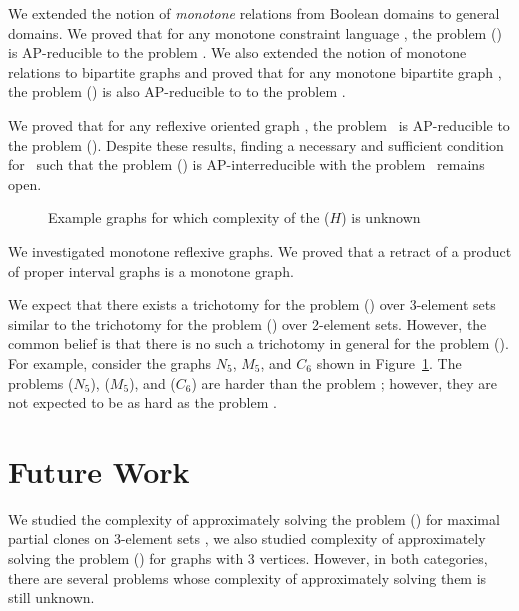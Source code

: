 We extended the notion of \emph{monotone} relations from Boolean domains to 
general domains. We proved that for any monotone constraint language \mrelset,
the problem \ccsp(\mrelset) is AP-reducible to the problem \cbis\@.
We also extended the notion of monotone relations to bipartite graphs 
and proved that for any monotone bipartite graph \mH, the problem \chom(\mH)  
is also AP-reducible to to the problem \cbis\@.

We proved that for any reflexive oriented graph \mH, the problem \cbis\ is
AP-reducible to the problem \chom(\mH).
Despite these results, finding a necessary and sufficient condition for \mrelset\ such that 
the problem \ccsp(\mrelset) is AP-interreducible with the problem \cbis\ remains open.

\begin{figure}
\centering
\subfigure[\ensuremath{N_5}]{\label{fig:n5}}\hfill
\subfigure[\ensuremath{M_5}]{\label{fig:m5}}\hfill
\subfigure[\ensuremath{C_6}]{\label{fig:c6}}
\caption{Example graphs for which complexity of the \chom(\ensuremath{H}) is unknown}
\label{fig:unknown}
\end{figure}

We investigated monotone reflexive graphs. We proved that a retract of
a product of proper interval graphs is a monotone graph.

We expect that there exists a trichotomy for the problem \ccsp(\mrelset) over 3-element sets
similar to the trichotomy for the problem \ccsp(\mrelset) over 2-element sets.
However, the common belief is that there is no such a trichotomy in general for
the problem \ccsp(\mrelset).
For example, consider the graphs \(N_5\), \(M_5\), and \(C_6\) shown in Figure~\ref{fig:unknown}.
The problems \chom(\(N_5\)), \chom(\(M_5\)), and \chom(\(C_6\)) are harder than
the problem \cbis; however, they are not expected to be as hard as the problem \csat\@.

\section{Future Work}
We studied the complexity of approximately solving 
the problem \ccsp(\mrelset) for maximal partial clones on
3-element sets \cite{mvl}, we also studied complexity of approximately solving 
the problem \chom(\mH) for graphs with 3 vertices. However, in both categories,
there are several problems whose complexity of approximately solving them is still unknown.


